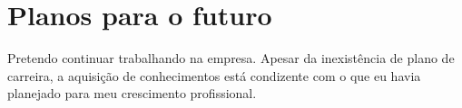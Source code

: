 
\section{Planos para o futuro}

Pretendo continuar trabalhando na empresa. Apesar da inexistência
de plano de carreira, a aquisição de conhecimentos está
condizente com o que eu havia planejado para meu crescimento
profissional.

